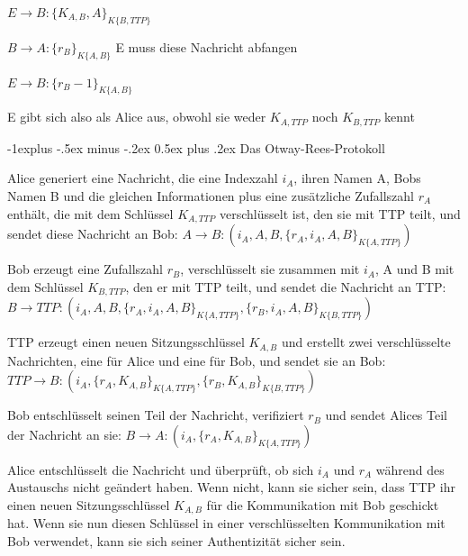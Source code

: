 \documentclass[a4paper]{article}
\makeatletter
\renewcommand{\subsection}{\@startsection{subsection}{2}{0mm}%
 {-1explus -.5ex minus -.2ex}%
 {0.5ex plus .2ex}%
 {\normalfont\normalsize\bfseries}}
\makeatother
\begin{document}
\begin{multicols}{3}
\begin{itemize*}
            \begin{enumerate*}
                  \item $E\rightarrow B:\{K_{A,B}, A\}_{{K}\{B,TTP\}}$
                  \item $B\rightarrow A:\{r_B\}_{{K}\{A,B\}}$ E muss diese Nachricht abfangen
                  \item $E\rightarrow B:\{r_B -1\}_{{K}\{A,B\}}$
                  \item E gibt sich also als Alice aus, obwohl sie weder $K_{A,TTP}$ noch $K_{B,TTP}$ kennt
            \end{enumerate*}
      \end{itemize*}

      \subsection{Das Otway-Rees-Protokoll}
      \begin{itemize*}
            \item Alice generiert eine Nachricht, die eine Indexzahl $i_A$, ihren Namen A, Bobs Namen B und die gleichen Informationen plus eine zusätzliche Zufallszahl $r_A$ enthält, die mit dem Schlüssel $K_{A,TTP}$ verschlüsselt ist, den sie mit TTP teilt, und sendet diese Nachricht an Bob: $A\rightarrow B:(i_A, A, B,\{r_A, i_A, A, B\}_{K\{A,TTP\}})$
            \item Bob erzeugt eine Zufallszahl $r_B$, verschlüsselt sie zusammen mit $i_A$, A und B mit dem Schlüssel $K_{B,TTP}$, den er mit TTP teilt, und sendet die Nachricht an TTP: $B\rightarrow TTP:(i_A, A, B,\{r_A,i_A,A,B\}_{K\{A,TTP\}},\{r_B,i_A,A,B\}_{K\{B,TTP\}})$
            \item TTP erzeugt einen neuen Sitzungsschlüssel $K_{A,B}$ und erstellt zwei verschlüsselte Nachrichten, eine für Alice und eine für Bob, und sendet sie an Bob: $TTP\rightarrow B:(i_A,\{r_A,K_{A,B}\}_{K\{A,TTP\}},\{r_B, K_{A,B}\}_{K\{B,TTP\}})$
            \item Bob entschlüsselt seinen Teil der Nachricht, verifiziert $r_B$ und sendet Alices Teil der Nachricht an sie: $B\rightarrow A:(i_A,\{r_A,K_{A,B}\}_{K\{A,TTP\}})$
            \item Alice entschlüsselt die Nachricht und überprüft, ob sich $i_A$ und $r_A$ während des Austauschs nicht geändert haben. Wenn nicht, kann sie sicher sein, dass TTP ihr einen neuen Sitzungsschlüssel $K_{A,B}$ für die Kommunikation mit Bob geschickt hat. Wenn sie nun diesen Schlüssel in einer verschlüsselten Kommunikation mit Bob verwendet, kann sie sich seiner Authentizität sicher sein.

\end{itemize*}
\end{multicols}
\end{document}
